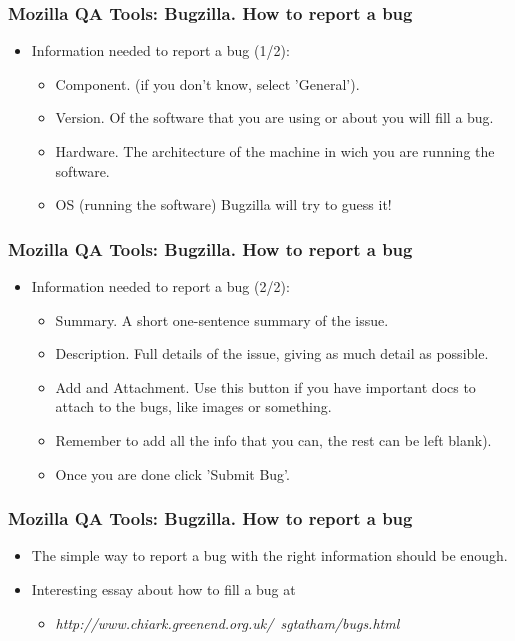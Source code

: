 \documentclass{beamer}
\begin{document}

\begin{frame}
 \frametitle{Mozilla QA Tools: Bugzilla. How to report a bug}
 \begin{itemize}
    \item Information needed to report a bug (1/2):
    \begin{itemize}
      \item Component. (if you don't know, select 'General').
      \item Version. Of the software that you are using or about you will fill a bug.
      \item Hardware. The architecture of the machine in wich you are running the software.
      \item OS (running the software) Bugzilla will try to guess it!
      \end{itemize}
 \end{itemize}
\end{frame}


\begin{frame}
 \frametitle{Mozilla QA Tools: Bugzilla. How to report a bug}
 \begin{itemize}
    \item Information needed to report a bug (2/2):
    \begin{itemize}
      \item Summary. A short one-sentence summary of the issue.
      \item Description. Full details of the issue, giving as much detail as possible.
      \item Add and Attachment. Use this button if you have important docs to attach to the bugs, like images or something.
      \item Remember to add all the info that you can, the rest can be left blank).
      \item Once you are done click 'Submit Bug'.
      \end{itemize}
 \end{itemize}
\end{frame}


\begin{frame}
 \frametitle{Mozilla QA Tools: Bugzilla. How to report a bug}
 \begin{itemize}
     \item The simple way to report a bug with the right information should be enough.
     \item Interesting essay about how to fill a bug at 
         \begin{itemize}
         \item \textit{http://www.chiark.greenend.org.uk/~sgtatham/bugs.html}
         \end{itemize}
 \end{itemize}
\end{frame}
\end{document}

